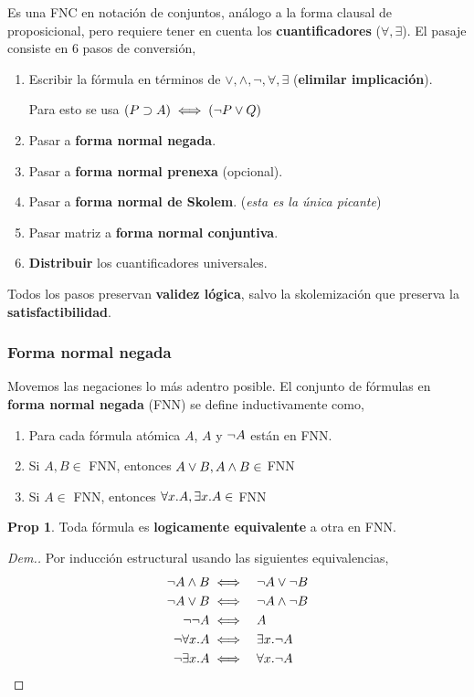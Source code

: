 \documentclass{report}
\theoremstyle{definition} %
\newtheorem*{proposition*}{Prop}
\begin{document}
Es una FNC en notación de conjuntos, análogo a la forma clausal de
proposicional, pero requiere tener en cuenta los \textbf{cuantificadores}
($\forall, \exists$). El pasaje consiste en 6 pasos de conversión,

\begin{enumerate}
    \item Escribir la fórmula en términos de $\vee, \wedge, \neg, \forall,
    \exists$ (\textbf{elimilar implicación}).

    Para esto se usa $(P \supset A) \iff (\neg P \vee Q)$

    \item Pasar a \textbf{forma normal negada}.
    \item Pasar a \textbf{forma normal prenexa} (opcional).
    \item Pasar a \textbf{forma normal de Skolem}. (\textit{esta es la única
    picante})
    \item Pasar matriz a \textbf{forma normal conjuntiva}.
    \item \textbf{Distribuir} los cuantificadores universales.
\end{enumerate}

Todos los pasos preservan \textbf{validez lógica}, salvo la skolemización que
preserva la \textbf{satisfactibilidad}.

\subsubsection{Forma normal negada}

Movemos las negaciones lo más adentro posible. El conjunto de fórmulas en
\textbf{forma normal negada} (FNN) se define inductivamente como,

\begin{enumerate}
    \item Para cada fórmula atómica $A$, $A$ y $\neg A$ están en FNN.
    \item Si $A, B \in$ FNN, entonces $A \vee B, A \wedge B \in$ FNN
    \item Si $A\in$ FNN, entonces $\forall x . A, \exists x . A \in$ FNN
\end{enumerate}

\begin{proposition*}
    Toda fórmula es \textbf{logicamente equivalente} a otra en FNN.
\end{proposition*}
\begin{proof}[Dem.]
    Por inducción estructural usando las siguientes equivalencias,
    \begin{alignat*}{2}
        \neg A \wedge B &\iff &&\neg A \vee \neg B\\
        \neg A \vee B &\iff &&\neg A \wedge \neg B\\
        \neg \neg A &\iff &&A\\
        \neg \forall x . A &\iff &&\exists x . \neg A\\
        \neg \exists x . A &\iff &&\forall x . \neg A
    \end{alignat*}
\end{proof}
\end{document}
